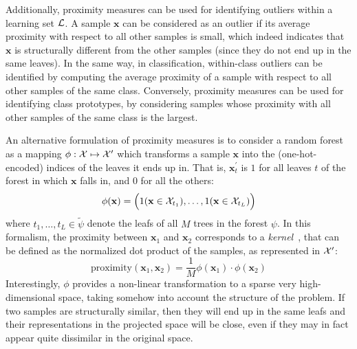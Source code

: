 Additionally, proximity measures can be used for identifying outliers within a
learning set ${\cal L}$. A sample $\mathbf{x}$ can be considered as an outlier
if its average proximity with respect to all other samples is small, which
indeed indicates that $\mathbf{x}$ is structurally different from the other
samples (since they do not end up in the same leaves). In the same way, in
classification, within-class outliers can be identified by computing the
average proximity of a sample with respect to all other samples of the same
class. Conversely, proximity measures can be used for identifying class
prototypes, by considering samples whose proximity with all other samples
of the same class is the largest.

An alternative formulation of proximity measures is to consider a random forest
as a mapping $\phi: {\cal X} \mapsto {\cal X}^\prime$ which transforms a sample
$\mathbf{x}$ into the (one-hot-encoded) indices of the leaves it ends up in.
That is, $\mathbf{x}^\prime_t$ is $1$ for all leaves $t$ of the forest in which
$\mathbf{x}$ falls in, and $0$ for all the others:
\begin{equation}
\phi(\mathbf{x}) = \Big( 1(\mathbf{x} \in {\cal X}_{t_1}), \dots, 1(\mathbf{x} \in {\cal X}_{t_L} ) \Big)
\end{equation}
where $t_1, \dots, t_L \in \widetilde{\psi}$ denote the leafs of all $M$ trees in the forest $\psi$.
In this formalism, the
proximity between $\mathbf{x}_1$ and $\mathbf{x}_2$ corresponds to a
\textit{kernel}~\citep{scholkopf:2001}\label{ntn:kernel2}, that can be defined as the normalized
dot product of the samples, as represented in ${\cal X}^\prime$:
\begin{equation}
\text{proximity}(\mathbf{x}_1, \mathbf{x}_2) = \frac{1}{M} \phi(\mathbf{x}_1) \cdot \phi(\mathbf{x}_2)
\end{equation}
Interestingly, $\phi$ provides a non-linear transformation to a sparse very
high-dimensional space, taking somehow into account the structure of the
problem. If two samples are structurally similar, then they will end up in the
same leafs and their representations in the projected space will be close, even
if they may in fact appear quite dissimilar in the original space.

